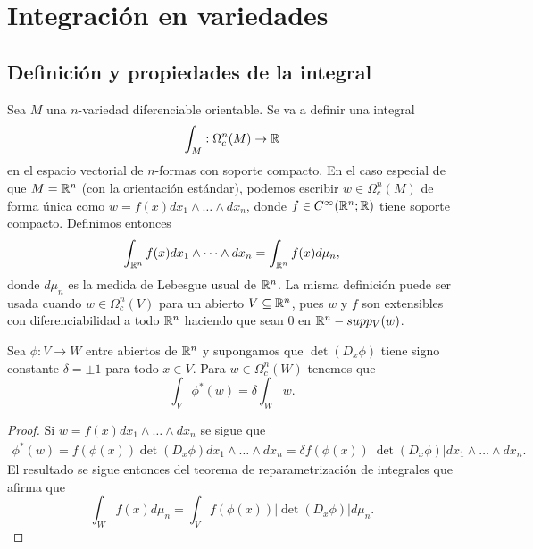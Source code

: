\documentclass[CV.tex]{subfiles}
\begin{document}

\chapter{Integración en variedades}




\section{Definición y propiedades de la integral}

Sea $M$ una $n$-variedad diferenciable orientable. Se va a definir una integral
\[
\int_M:\Omega_c^n(M)\to\mathbb{R}
\]
en el espacio vectorial de $n$-formas con soporte compacto. En el caso especial de que $M=\mathbb{R}^n$ (con la orientación estándar), podemos escribir $w\in\Omega_c^n(M)$ de forma única como $w=f(x)dx_1\land\dots\land dx_n$, donde $f\in C^{\infty}(\mathbb{R}^n;\mathbb{R})$ tiene soporte compacto. Definimos entonces
\[
\int_{\mathbb{R}^n}f(x)dx_1\land\dots\land dx_n=\int_{\mathbb{R}^n} f(x)d\mu_n,
\]
donde $d\mu_n$ es la medida de Lebesgue usual de $\mathbb{R}^n$. La misma definición puede ser usada cuando $w\in\Omega_c^n(V)$ para un abierto $V\subseteq\mathbb{R}^n$, pues $w$ y $f$ son extensibles con diferenciabilidad a todo $\mathbb{R}^n$ haciendo que sean 0 en $\mathbb{R}^n-supp_V(w)$. 

\begin{lemma}
Sea $\phi:V\to W$ entre abiertos de $\mathbb{R}^n$ y supongamos que $\det(D_x\phi)$ tiene signo constante $\delta=\pm 1$ para todo $x\in V$. Para $w\in\Omega_c^n(W)$ tenemos que
\[
\int_V\phi^*(w)=\delta\int_Ww.
\]
\end{lemma}
\begin{proof}
Si $w=f(x)dx_1\land\dots\land dx_n$ se sigue que
\begin{align*}
\phi^*(w)=f(\phi(x))\det(D_x\phi)dx_1\land\dots\land dx_n=\delta f(\phi(x))|\det(D_x\phi)|dx_1\land\dots\land dx_n.
\end{align*}
El resultado se sigue entonces del teorema de reparametrización de integrales que afirma que
\[
\int_W f(x)d\mu_n=\int_V f(\phi(x))|\det(D_x\phi)|d\mu_n.
\]
\end{proof}
\end{document}
